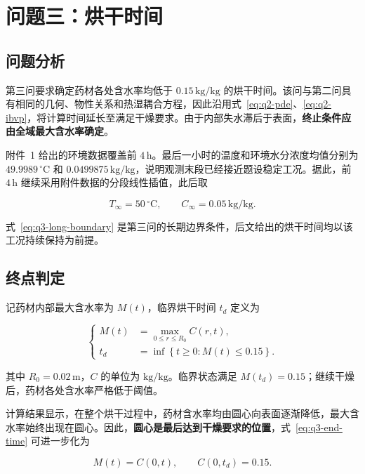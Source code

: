\section{问题三：烘干时间}

\subsection{问题分析}

第三问要求确定药材各处含水率均低于 $0.15\,\mathrm{kg/kg}$ 的烘干时间。该问与第二问具有相同的几何、物性关系和热湿耦合方程，因此沿用式~\eqref{eq:q2-pde}、\eqref{eq:q2-ibvp}，将计算时间延长至满足干燥要求。由于内部失水滞后于表面，\textbf{终止条件应由全域最大含水率确定}。

附件~1 给出的环境数据覆盖前 $4\,\mathrm h$。最后一小时的温度和环境水分浓度均值分别为 $49.9989\,{}^\circ\mathrm C$ 和 $0.0499875\,\mathrm{kg/kg}$，说明观测末段已经接近题设稳定工况。据此，前 $4\,\mathrm h$ 继续采用附件数据的分段线性插值，此后取

\begin{equation}
  T_\infty=50\,{}^\circ\mathrm C,\qquad
  C_\infty=0.05\,\mathrm{kg/kg}.
  \label{eq:q3-long-boundary}
\end{equation}

式~\eqref{eq:q3-long-boundary} 是第三问的长期边界条件，后文给出的烘干时间均以该工况持续保持为前提。

\subsection{终点判定}

记药材内部最大含水率为 $M(t)$，临界烘干时间 $t_d$ 定义为

\begin{equation}
  \left\{
  \begin{aligned}
    M(t)&=\max_{0\le r\le R_0}C(r,t),\\
    t_d&=\inf\left\{t\ge0:M(t)\le0.15\right\}.
  \end{aligned}
  \right.
  \label{eq:q3-end-time}
\end{equation}

其中 $R_0=0.02\,\mathrm m$，$C$ 的单位为 $\mathrm{kg/kg}$。临界状态满足 $M(t_d)=0.15$；继续干燥后，药材各处含水率严格低于阈值。

计算结果显示，在整个烘干过程中，药材含水率均由圆心向表面逐渐降低，最大含水率始终出现在圆心。因此，\textbf{圆心是最后达到干燥要求的位置}，式~\eqref{eq:q3-end-time} 可进一步化为

\begin{equation}
  M(t)=C(0,t),\qquad C(0,t_d)=0.15.
  \label{eq:q3-center-event}
\end{equation}

